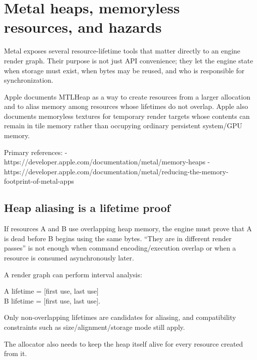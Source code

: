 \hypertarget{appendix-563b2cb23fc3}{}\label{referencestart:appendix-563b2cb23fc3}
\section{Metal heaps, memoryless resources, and hazards}\label{appendix-563b2cb23fc3-metal-heaps-memoryless-resources-and-hazards}

\hypertarget{appendix-563b2cb23fc3-metal-heaps-memoryless-resources-and-hazards}{}

Metal exposes several resource-lifetime tools that matter directly to an engine render graph. Their purpose is not just API convenience; they let the engine state when storage must exist, when bytes may be reused, and who is responsible for synchronization.

Apple documents MTLHeap as a way to create resources from a larger allocation and to alias memory among resources whose lifetimes do not overlap. Apple also documents memoryless textures for temporary render targets whose contents can remain in tile memory rather than occupying ordinary persistent system/GPU memory.

Primary references: - https://developer.apple.com/documentation/metal/memory-heaps - https://developer.apple.com/documentation/metal/reducing-the-memory-footprint-of-metal-apps

\subsection{Heap aliasing is a lifetime proof}\label{appendix-563b2cb23fc3-heap-aliasing-is-a-lifetime-proof}

\hypertarget{appendix-563b2cb23fc3-heap-aliasing-is-a-lifetime-proof}{}

If resources A and B use overlapping heap memory, the engine must prove that A is dead before B begins using the same bytes. ``They are in different render passes'' is not enough when command encoding/execution overlap or when a resource is consumed asynchronously later.

A render graph can perform interval analysis:

A lifetime = {[}first use, last use{]}\\
B lifetime = {[}first use, last use{]}.

Only non-overlapping lifetimes are candidates for aliasing, and compatibility constraints such as size/alignment/storage mode still apply.

The allocator also needs to keep the heap itself alive for every resource created from it.

